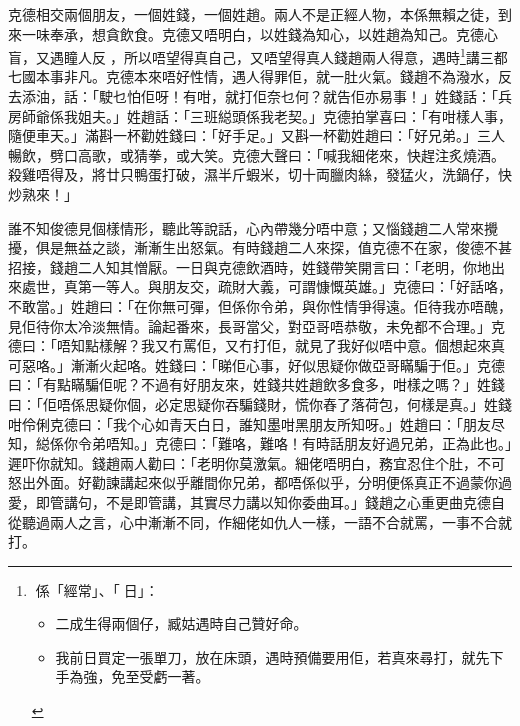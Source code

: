 \documentclass[a5paper, 12pt, openany]{book} %
\begin{document}
	克德相交兩個朋友，一個姓錢，一個姓趙。兩人不是正經人物，本係無賴之徒，到來一味奉承，想貪飲食。克德又唔明白，以姓錢為知心，以姓趙為知己。克德心盲，又遇瞳人反𣅜，所以唔望得真自己，又唔望得真人錢趙兩人得意，遇時\footnote{
  係「經常」、「日」：
  \begin{itemize}[itemsep=0pt, parsep=0pt]
    \item 二成生得兩個仔，臧姑遇時自己贊好命。
    \item 我前日買定一張單刀，放在床頭，遇時預備要用佢，若真來尋打，就先下手為強，免至受虧一著。
  \end{itemize}
  }講三都七國本事非凡。克德本來唔好性情，遇人得罪佢，就一肚火氣。錢趙不為潑水，反去添油，話：「駛乜怕佢呀！有咁，就打佢奈乜何？就告佢亦易事！」姓錢話：「兵房師爺係我姐夫。」姓趙話：「三班縂頭係我老契。」克德拍掌喜曰：「有咁樣人事，隨便車天。」滿斟一杯勸姓錢曰：「好手足。」又斟一杯勸姓趙曰：「好兄弟。」三人暢飲，劈口高歌，或猜拳，或大笑。克德大聲曰：「喊我細佬來，快趕注炙燒酒。殺雞唔得及，將廿只鴨蛋打破，濕半斤蝦米，切十両臘肉絲，發猛火，洗鍋仔，快炒熟來！」

	誰不知俊德見個樣情形，聽此等說話，心內帶幾分唔中意；又惱錢趙二人常來攪擾，俱是無益之談，漸漸生出怒氣。有時錢趙二人來探，值克德不在家，俊德不甚招接，錢趙二人知其憎厭。一日與克德飲酒時，姓錢帶笑開言曰：「老明，你地出來處世，真第一等人。與朋友交，疏財大義，可謂慷慨英雄。」克德曰：「好話咯，不敢當。」姓趙曰：「在你無可彈，但係你令弟，與你性情爭得遠。佢待我亦唔醜，見佢待你太冷淡無情。論起番來，長哥當父，對亞哥唔恭敬，未免都不合理。」克德曰：「唔知點樣解？我又冇罵佢，又冇打佢，就見了我好似唔中意。個想起來真可惡咯。」漸漸火起咯。姓錢曰：「睇佢心事，好似思疑你做亞哥瞞騙于佢。」克德曰：「有點瞞騙佢呢？不過有好朋友來，姓錢共姓趙飲多食多，咁樣之嗎？」姓錢曰：「佢唔係思疑你個，必定思疑你吞騙錢財，慌你舂了落荷包，何樣是真。」姓錢咁伶俐克德曰：「我个心如青天白日，誰知墨咁黑朋友所知呀。」姓趙曰：「朋友尽知，縂係你令弟唔知。」克德曰：「難咯，難咯！有時話朋友好過兄弟，正為此也。」遲吓你就知。錢趙兩人勸曰：「老明你莫激氣。細佬唔明白，務宜忍住个肚，不可怒出外面。好勸諫講起來似乎離間你兄弟，都唔係似乎，分明便係真正不過蒙你過愛，即管講句，不是即管講，其實尽力講以知你委曲耳。」錢趙之心重更曲克德自從聽過兩人之言，心中漸漸不同，作細佬如仇人一樣，一語不合就罵，一事不合就打。
\end{document}
